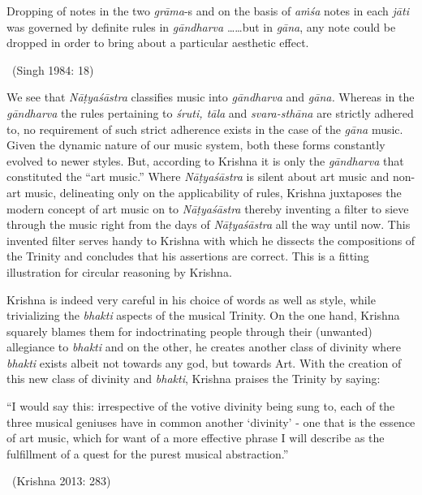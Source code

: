 \begin{myquote}
Dropping of notes in the two \textit{grāma}-s and on the basis of \textit{aṁśa} notes in each \textit{jāti} was governed by definite rules in \textit{gāndharva} ……but in \textit{gāna}, any note could be dropped in order to bring about a particular aesthetic effect. 

~\hfill (Singh 1984: 18)
\end{myquote}

We see that \textit{Nāṭyaśāstra} classifies music into \textit{gāndharva} and \textit{gāna.} Whereas in the \textit{gāndharva} the rules pertaining to \textit{śruti, tāla} and \textit{svara-sthāna} are strictly adhered to, no requirement of such strict adherence exists in the case of the \textit{gāna} music. Given the dynamic nature of our music system, both these forms constantly evolved to newer styles. But, according to Krishna it is only the \textit{gāndharva} that constituted the “art music.” Where \textit{Nāṭyaśāstra} is silent about art music and non-art music, delineating only on the applicability of rules, Krishna juxtaposes the modern concept of art music on to \textit{Nāṭyaśāstra} thereby inventing a filter to sieve through the music right from the days of \textit{Nāṭyaśāstra} all the way until now. This invented filter serves handy to Krishna with which he dissects the compositions of the Trinity and concludes that his assertions are correct. This is a fitting illustration for circular reasoning by Krishna.

Krishna is indeed very careful in his choice of words as well as style, while trivializing the \textit{bhakti} aspects of the musical Trinity. On the one hand, Krishna squarely blames them for indoctrinating people through their (unwanted) allegiance to \textit{bhakti} and on the other, he creates another class of divinity where \textit{bhakti} exists albeit not towards any god, but towards Art. With the creation of this new class of divinity and \textit{bhakti}, Krishna praises the Trinity by saying:

\begin{myquote}
“I would say this: irrespective of the votive divinity being sung to, each of the three musical geniuses have in common another ‘divinity’ - one that is the essence of art music, which for want of a more effective phrase I will describe as the fulfillment of a quest for the purest musical abstraction.” 

~\hfill (Krishna 2013: 283)
\end{myquote}

